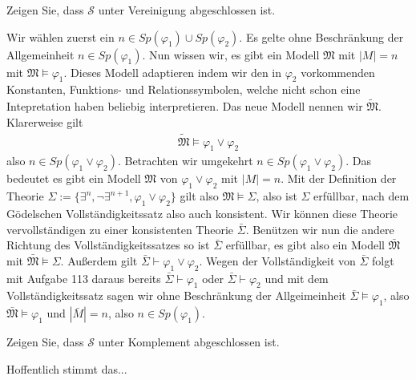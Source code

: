 \begin{exercise}[73]

\phantom{}
	Zeigen Sie, dass $\mathscr{S}$ unter Vereinigung abgeschlossen ist.

\end{exercise}


\begin{solution}

\phantom{}
	Wir wählen zuerst ein $n \in Sp(\varphi_1) \cup Sp(\varphi_2)$. Es gelte ohne Beschränkung der Allgemeinheit $n \in Sp(\varphi_1)$. Nun wissen wir, es gibt ein Modell $\mathfrak{M}$ mit $|M| = n$ mit $\mathfrak{M} \vDash \varphi_1$. Dieses Modell adaptieren indem wir den in $\varphi_2$ vorkommenden Konstanten, Funktions- und Relationssymbolen, welche nicht schon eine Intepretation haben beliebig interpretieren. Das neue Modell nennen wir $\tilde{\mathfrak{M}}$. Klarerweise gilt
	\begin{align*}
		\tilde{\mathfrak{M}} \vDash \varphi_1 \lor \varphi_2
	\end{align*}
	also $n \in Sp(\varphi_1 \lor \varphi_2)$. \newline
	Betrachten wir umgekehrt $n \in Sp(\varphi_1 \lor \varphi_2)$. Das bedeutet es gibt ein Modell
	 $\mathfrak{M}$ von $\varphi_1 \lor \varphi_2$ mit $|M| = n$.
	 Mit der Definition der Theorie
	 $\Sigma := \{\exists^n, \neg \exists^{n + 1}, \varphi_1 \lor \varphi_2\}$
	 gilt also $\mathfrak{M} \vDash \Sigma$, also ist $\Sigma$ erfüllbar,
	 nach dem Gödelschen Vollständigkeitssatz also auch konsistent.
	 Wir können diese Theorie vervollständigen zu einer konsistenten Theorie $\bar{\Sigma}$.
	 Benützen wir nun die andere Richtung des Vollständigkeitssatzes so ist $\bar{\Sigma}$ erfüllbar,
	 es gibt also ein Modell $\bar{\mathfrak{M}}$ mit $\bar{\mathfrak{M}} \vDash \Sigma$.
	 Außerdem gilt
	 $\bar{\Sigma} \vdash \varphi_1 \lor \varphi_2$.
	 Wegen der Vollständigkeit von $\bar{\Sigma}$ folgt mit Aufgabe 113 daraus bereits $\bar{\Sigma} \vdash \varphi_1$ oder 
	 $\bar{\Sigma} \vdash \varphi_2$ und mit dem Vollständigkeitssatz sagen wir
	 ohne Beschränkung der Allgeimeinheit $\bar{\Sigma} \vDash \varphi_1$,
	 also $\bar{\mathfrak{M}} \vDash \varphi_1$ und $|\bar{M}| = n$, also $n \in Sp(\varphi_1)$.
\end{solution}

\begin{exercise}[74]

\phantom{}
	Zeigen Sie, dass $\mathscr{S}$ unter Komplement abgeschlossen ist.

\end{exercise}


\begin{solution}

\phantom{}
	Hoffentlich stimmt das...

\end{solution}
